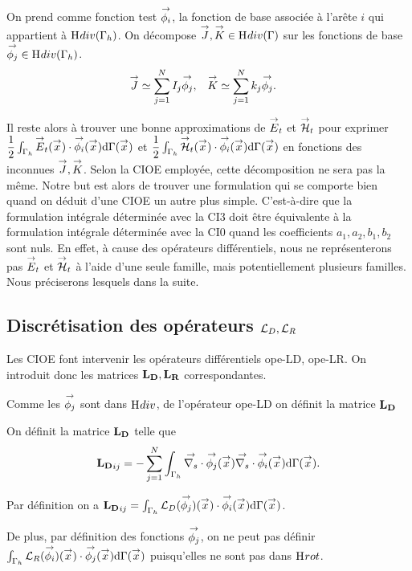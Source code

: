   On prend comme fonction test \(\phii\), la fonction de base associée à l'arête \(i\) qui appartient à \(\Hdiv(\Gamma_h)\).
  On décompose \(\vJ,\vK \in \Hdiv(\Gamma)\) sur les fonctions de base \(\phij \in \Hdiv(\Gamma_h)\).
    \begin{align*}
      \vJ & \simeq \sum_{j=1}^N I_j \phij,
      &
      \vK & \simeq \sum_{j=1}^N k_j \phij.
    \end{align*}

  Il reste alors à trouver une bonne approximations de \(\vE_t\) et \(\vH_t\) pour exprimer \( \frac{1}{2} \int_{\Gamma_h} \vE_t(\vx) \cdot \phii(\vx) \dd{\Gamma}(\vx)\) et \(\frac{1}{2} \int_{\Gamma_h} \vH_t(\vx) \cdot \phii(\vx) \dd{\Gamma}(\vx)\) en fonctions des inconnues \(\vJ, \vK\). Selon la CIOE employée, cette décomposition ne sera pas la même. Notre but est alors de trouver une formulation qui se comporte bien quand on déduit d'une CIOE un autre plus simple. C'est-à-dire que la formulation intégrale déterminée avec la CI3 doit être équivalente à la formulation intégrale déterminée avec la CI0 quand les coefficients \(a_1,a_2,b_1,b_2\) sont nuls. En effet, à cause des opérateurs différentiels, nous ne représenterons pas \(\vE_t\) et \(\vH_t\) à l'aide d'une seule famille, mais potentiellement plusieurs familles. Nous préciserons lesquels dans la suite.

  \subsection[Discrétisation des opérateurs LD, LR]{Discrétisation des opérateurs \(\LD,\LR\)}
    Les CIOE font intervenir les opérateurs différentiels \gls{ope-LD}, \gls{ope-LR}. On introduit donc les matrices \(\mLD,\mLR\) correspondantes.

    Comme les \(\phij\) sont dans \(\Hdiv\), de l'opérateur \gls{ope-LD} on définit la matrice \(\mLD\)
    \begin{defn}
      On définit la matrice \(\mLD\) telle que
      \begin{align*}
          \mLD_{ij} = - \sum_{j=1}^N \int_{\Gamma_h} \vdivs \phij(\vx) \vdivs \phii(\vx) \dd{\Gamma}(\vx).
      \end{align*}
    \end{defn}

    Par définition on a \(\mLD_{ij} = \int_{\Gamma_h} \LD(\phij)(\vx)\cdot\phii(\vx)\dd{\Gamma}(\vx)\).

    De plus, par définition des fonctions \(\phij\), on ne peut pas définir \( \int_{\Gamma_h} \LR(\phii)(\vx) \cdot \phij(\vx) \dd{\Gamma}(\vx)\) puisqu'elles ne sont pas dans \(\Hrot\).

